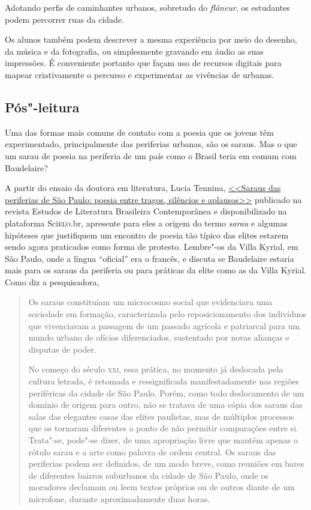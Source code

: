 \documentclass[12pt]{extarticle}
\begin{document}

Adotando perfis de caminhantes urbanos, sobretudo do \textit{flâneur}, os
estudantes podem percorrer ruas da cidade.

Os alunos também podem descrever a mesma experiência por meio do desenho, 
da música e da fotografia, ou simplesmente gravando em áudio as 
suas impressões. É conveniente portanto que façam uso
de recursos digitais para mapear criativamente o percurso e
experimentar as vivências de urbanas.

\subsection{Pós"-leitura}

Uma das formas mais comuns de contato com a poesia que os jovens 
têm experimentado, principalmente das periferias urbanas, são 
os saraus. Mas o que um sarau de poesia na periferia de um 
país como o Brasil teria em comum com Baudelaire? 

A partir do ensaio da doutora em literatura, Lucia Tennina, 
\href{http://www.scielo.br/pdf/elbc/n42/01.pdf}{<<Saraus das periferias de São Paulo:
poesia entre tragos, silêncios e aplausos>>} publicado na revista 
Estudos de Literatura Brasileira Contemporânea e disponibilizado 
na plataforma Sci\textsc{elo}.br, apresente para eles a origem do termo 
\emph{sarau} e algumas hipóteses que justifiquem um encontro de poesia
tão típico das elites estarem sendo agora praticados como forma 
de protesto. Lembre"-os da Villa Kyrial, em São Paulo, 
onde a língua ``oficial'' era o francês, e discuta se Baudelaire 
estaria mais para os saraus da periferia ou para práticas 
da elite como as da Villa Kyrial. Como diz a pesquisadora, 

\begin{quote}
Os saraus constituíam um microcosmo social que evidenciava uma
sociedade em formação, caracterizada pelo reposicionamento dos indivíduos 
que vivenciavam a passagem de um passado agrícola e patriarcal
para um mundo urbano de ofícios diferenciados, sustentado por novas
alianças e disputas de poder.

No começo do século \textsc{xxi}, essa prática, no momento já deslocada pela
cultura letrada, é retomada e ressignificada manifestadamente nas regiões
periféricas da cidade de São Paulo. Porém, como todo deslocamento de
um domínio de origem para outro, não se tratava de uma cópia dos saraus
das salas das elegantes casas das elites paulistas, mas de múltiplos 
processos que os tornaram diferentes a ponto de não permitir comparações entre
si. Trata"-se, pode"-se dizer, de uma apropriação livre que mantém apenas o
rótulo sarau e a arte como palavra de ordem central.
Os saraus das periferias podem ser definidos, de um modo breve,
como reuniões em bares de diferentes bairros suburbanos da cidade de
São Paulo, onde os moradores declamam ou leem textos próprios ou de outros 
diante de um microfone, durante aproximadamente duas horas. 
\end{quote}
\end{document}
